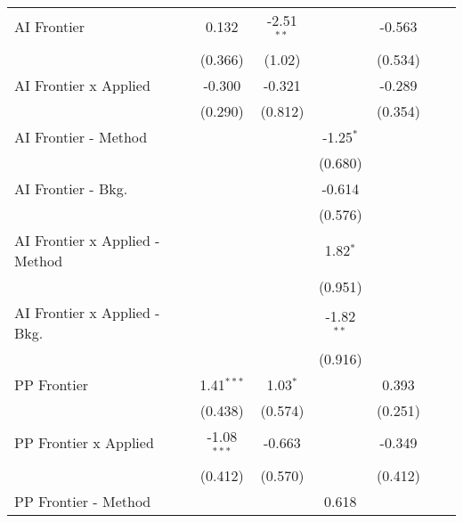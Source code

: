 \begin{tabular}{lcccccc}
   AI Frontier                    & 0.132         & -2.51$^{**}$ &              & -0.563        &        &   \\   
                                  & (0.366)       & (1.02)       &              & (0.534)       &        &   \\   
   AI Frontier x Applied          & -0.300        & -0.321       &              & -0.289        &        &   \\   
                                  & (0.290)       & (0.812)      &              & (0.354)       &        &   \\   
   AI Frontier - Method           &               &              & -1.25$^{*}$  &               &        &   \\   
                                  &               &              & (0.680)      &               &        &   \\   
   AI Frontier - Bkg.             &               &              & -0.614       &               &        &   \\   
                                  &               &              & (0.576)      &               &        &   \\   
   AI Frontier x Applied - Method &               &              & 1.82$^{*}$   &               &        &   \\   
                                  &               &              & (0.951)      &               &        &   \\   
   AI Frontier x Applied - Bkg.   &               &              & -1.82$^{**}$ &               &        &   \\   
                                  &               &              & (0.916)      &               &        &   \\   
   PP Frontier                    & 1.41$^{***}$  & 1.03$^{*}$   &              & 0.393         &        &   \\   
                                  & (0.438)       & (0.574)      &              & (0.251)       &        &   \\   
   PP Frontier x Applied          & -1.08$^{***}$ & -0.663       &              & -0.349        &        &   \\   
                                  & (0.412)       & (0.570)      &              & (0.412)       &        &   \\   
   PP Frontier - Method           &               &              & 0.618        &               &        &   \\   

\end{tabular}
